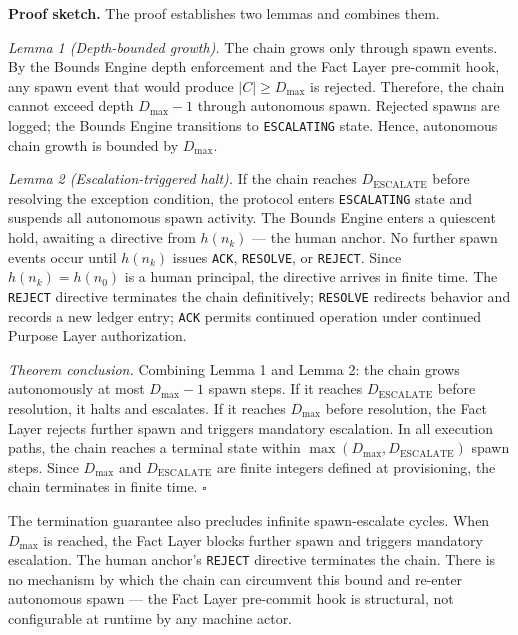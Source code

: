 \medskip
\noindent\textbf{Proof sketch.} The proof establishes two lemmas and combines them.

\medskip
\textit{Lemma 1 (Depth-bounded growth).} The chain grows only through spawn events. By the Bounds Engine depth enforcement and the Fact Layer pre-commit hook, any spawn event that would produce $|C| \geq D_{\mathrm{max}}$ is rejected. Therefore, the chain cannot exceed depth $D_{\mathrm{max}} - 1$ through autonomous spawn. Rejected spawns are logged; the Bounds Engine transitions to \texttt{ESCALATING} state. Hence, autonomous chain growth is bounded by $D_{\mathrm{max}}$.

\medskip
\textit{Lemma 2 (Escalation-triggered halt).} If the chain reaches $D_{\mathrm{ESCALATE}}$ before resolving the exception condition, the protocol enters \texttt{ESCALATING} state and suspends all autonomous spawn activity. The Bounds Engine enters a quiescent hold, awaiting a directive from $h(n_k)$ — the human anchor. No further spawn events occur until $h(n_k)$ issues \texttt{ACK}, \texttt{RESOLVE}, or \texttt{REJECT}. Since $h(n_k) = h(n_0)$ is a human principal, the directive arrives in finite time. The \texttt{REJECT} directive terminates the chain definitively; \texttt{RESOLVE} redirects behavior and records a new ledger entry; \texttt{ACK} permits continued operation under continued Purpose Layer authorization.

\medskip
\textit{Theorem conclusion.} Combining Lemma 1 and Lemma 2: the chain grows autonomously at most $D_{\mathrm{max}} - 1$ spawn steps. If it reaches $D_{\mathrm{ESCALATE}}$ before resolution, it halts and escalates. If it reaches $D_{\mathrm{max}}$ before resolution, the Fact Layer rejects further spawn and triggers mandatory escalation. In all execution paths, the chain reaches a terminal state within $\max(D_{\mathrm{max}}, D_{\mathrm{ESCALATE}})$ spawn steps. Since $D_{\mathrm{max}}$ and $D_{\mathrm{ESCALATE}}$ are finite integers defined at provisioning, the chain terminates in finite time. $\square$

The termination guarantee also precludes infinite spawn-escalate cycles. When $D_{\mathrm{max}}$ is reached, the Fact Layer blocks further spawn and triggers mandatory escalation. The human anchor's \texttt{REJECT} directive terminates the chain. There is no mechanism by which the chain can circumvent this bound and re-enter autonomous spawn — the Fact Layer pre-commit hook is structural, not configurable at runtime by any machine actor.

